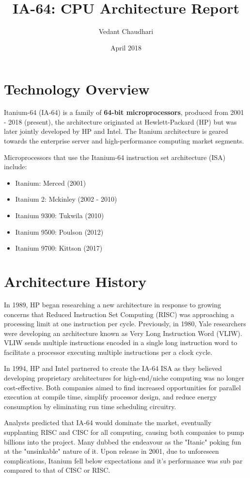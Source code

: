 \documentclass{article}
\title{IA-64: CPU Architecture Report}
\author{Vedant Chaudhari}
\date{April 2018}
\begin{document}
\maketitle

\section{Technology Overview}

Itanium-64 (IA-64) is a family of \textbf{64-bit microprocessors}, produced from 2001 -  2018 (present), the architecture originated at Hewlett-Packard (HP) but was later jointly developed by HP and Intel. The Itanium architecture is geared towards the enterprise server and high-performance computing market segments.

Microprocessors that use the Itanium-64 instruction set architecture (ISA) include:
\begin{itemize}
    \item Itanium: Merced (2001)
    \item Itanium 2: Mckinley (2002 - 2010)
    \item Itanium 9300: Tukwila (2010)
    \item Itanium 9500: Poulson (2012)
    \item Itanium 9700: Kittson (2017)
\end{itemize}

\section{Architecture History}
In 1989, HP began researching a new architecture in response to growing concerns that Reduced Instruction Set Computing (RISC) was approaching a processing limit at one instruction per cycle. Previously, in 1980, Yale researchers were developing an architecture known as Very Long Instruction Word (VLIW). VLIW sends multiple instructions encoded in a single long instruction word to facilitate a processor executing multiple instructions per a clock cycle.

In 1994, HP and Intel partnered to create the IA-64 ISA as they believed developing proprietary architectures for high-end/niche computing was no longer cost-effective. Both companies aimed to find increased opportunities for parallel execution at compile time, simplify processor design, and reduce energy consumption by eliminating run time scheduling circuitry.

Analysts predicted that IA-64 would dominate the market, eventually supplanting RISC and CISC for all computing, causing both companies to pump billions into the project. Many dubbed the endeavour as the "Itanic" poking fun at the "unsinkable" nature of it. Upon release in 2001, due to unforeseen complications, Itanium fell below expectations and it's performance was sub par compared to that of CISC or RISC.
\end{document}
